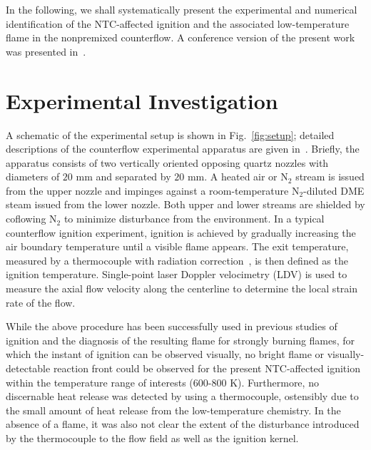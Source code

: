 \documentclass[review,3p,times]{elsarticleUS}
\begin{document}
In the following, we shall systematically present the experimental and numerical identification of the NTC-affected ignition and the associated low-temperature flame in the nonpremixed counterflow.  A conference version of the present work was presented in~\cite{deng13}.

\section{Experimental Investigation}

A schematic of the experimental setup is shown in Fig.~\ref{fig:setup}; detailed descriptions of the counterflow experimental apparatus are given in~\cite{fotache95,liu10a}.  Briefly, the apparatus consists of two vertically oriented opposing quartz nozzles with diameters of $20$ mm and separated by $20$ mm.  A heated air or N$_2$ stream is issued from the upper nozzle and impinges against a room-temperature N$_2$-diluted DME steam issued from the lower nozzle.  Both upper and lower streams are shielded by coflowing N$_2$ to minimize disturbance from the environment.  In a typical counterflow ignition experiment, ignition is achieved by gradually increasing the air boundary temperature until a visible flame appears. The exit temperature, measured by a thermocouple with radiation correction~\cite{zheng06}, is then defined as the ignition temperature. Single-point laser Doppler velocimetry (LDV) is used to measure the axial flow velocity along the centerline to determine the local strain rate of the flow.

While the above procedure has been successfully used in previous studies of ignition and the diagnosis of the resulting flame for strongly burning flames, for which the instant of ignition can be observed visually, no bright flame or visually-detectable reaction front could be observed for the present NTC-affected ignition within the temperature range of interests ($600$-$800$ K).  Furthermore, no discernable heat release was detected by using a thermocouple, ostensibly due to the small amount of heat release from the low-temperature chemistry.  In the absence of a flame, it was also not clear the extent of the disturbance introduced by the thermocouple to the flow field as well as the ignition kernel.
\end{document}
